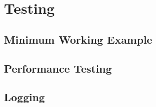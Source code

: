 

\chapter{Testing}
    \section{Minimum Working Example}
    \section{Performance Testing}
    \section{Logging}

